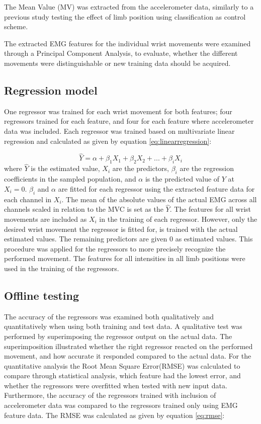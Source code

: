 The Mean Value (MV) was extracted from the accelerometer data, similarly to a previous study \cite{Krasoulis2015} testing the effect of limb position using classification as control scheme. 

The extracted EMG features for the individual wrist movements were examined through a Principal Component Analysis, to evaluate, whether the different movements were distinguishable or new training data should be acquired.

\subsection{Regression model}
One regressor was trained for each wrist movement for both features; four regressors trained for each feature, and four for each feature where accelerometer data was included. Each regressor was trained based on multivariate linear regression and calculated as given by equation \ref{eq:linearregression}:

\begin{equation} \label{eq:linearregression}
\hat{Y} = \alpha + \beta_1 X_{1} + \beta_2 X_{2} + ... + \beta_i X_{i}
\end{equation}
where $\hat{Y}$ is the estimated value, $X_i$ are the predictors, $\beta_i$ are the regression coefficients in the sampled population, and $\alpha$ is the predicted value of $Y$ at $X_{i} = 0$. $\beta_i$ and $\alpha$ are fitted for each regressor using the extracted feature data for each channel in $X_i$. The mean of the absolute values of the actual EMG across all channels scaled in relation to the MVC is set as the $\hat{Y}$. The features for all wrist movements are included as $X_i$ in the training of each regressor. However, only the desired wrist movement the regressor is fitted for, is trained with the actual estimated values. The remaining predictors are given 0 as estimated values. This procedure was applied for the regressors to more precisely recognize the performed movement. The features for all intensities in all limb positions were used in the training of the regressors.

\subsection{Offline testing}
The accuracy of the regressors was examined both qualitatively and quantitatively when using both training and test data. A qualitative test was performed by superimposing the regressor output on the actual data. The superimposition illustrated whether the right regressor reacted on the performed movement, and how accurate it responded compared to the actual data. For the quantitative analysis the Root Mean Square Error(RMSE) was calculated to compare through statistical analysis, which feature had the lowest error, and whether the regressors were overfitted when tested with new input data. Furthermore, the accuracy of the regressors trained with inclusion of accelerometer data was compared to the regressors trained only using EMG feature data. The RMSE was calculated as given by equation \ref{eq:rmse}:


